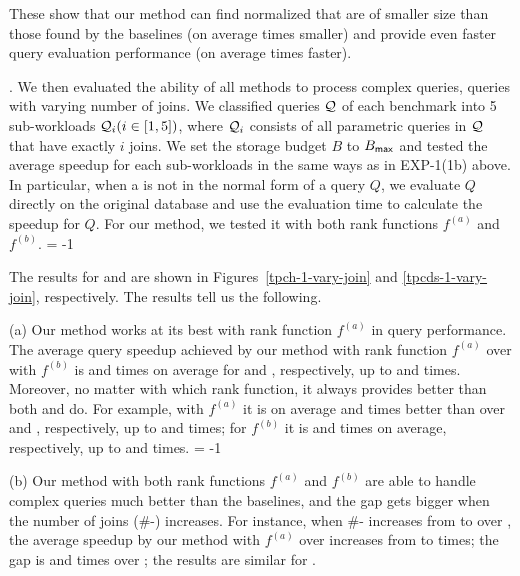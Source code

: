 \vspace{1ex}
These show that our method can find normalized \bdss that are of
smaller size than those found by the baselines (\eg on average 
times smaller) and %
provide even faster query evaluation
performance (\eg on average  times faster).





.
We then evaluated the ability of all methods to process complex
queries, \ie queries with varying number of %
joins. We
classified queries $\mathcal Q$ of each benchmark into 5 sub-workloads
$\mathcal Q_{i}\allowbreak (i\allowbreak\in\allowbreak [1,\allowbreak 5])$, 
where $\mathcal Q_{i}$ consists of all parametric queries in $\mathcal Q$ that have exactly $i$
joins. We set the storage budget $B$ to $B_{\protect\mathsf{max}}$ and tested the average
speedup for each sub-workloads in the same ways as in EXP-1(1b)
above. In particular, when a \bds is not in the normal form of a
query $Q$, we evaluate $Q$ directly on the original database and
use the evaluation time to calculate the speedup for $Q$.
For our method, we tested it with both rank functions $f^{(a)}$
and $f^{(b)}$.
\looseness = -1

\vspace{0.6ex}
The results for \tpch and \tpcds are shown in
Figures~\ref{tpch-1-vary-join} and \ref{tpcds-1-vary-join},
respectively. The results tell us the following. 

\sstab (a) Our method works at its best with rank
function $f^{(a)}$ in %
query performance.
The average query speedup achieved by our method
with rank function $f^{(a)}$ over %
with
$f^{(b)}$ is  and  times on average for \tpch and \tpcds,
respectively, up to  and  times.
Moreover, no matter with which rank function, it always
provides \bdss better than both \qcssel and \uscsel do.
For example, with $f^{(a)}$ it is on average  and 
times better than \qcssel over \tpch and \tpcds, respectively,
up to  and  times; for $f^{(b)}$ it is  and
 times on average, respectively, up to  and  times.
\looseness = -1

\sstab (b) Our method with both rank functions $f^{(a)}$ and
$f^{(b)}$ are able to handle complex queries much better than
the baselines, and the gap gets bigger when the number
of joins (\#-) increases.
For instance, when \#- increases from  to  over
\tpcds, the average speedup by our method with $f^{(a)}$ over
\qcssel increases from  to  times; the gap is  and 
times over \uscsel; the results are similar for \tpch.


